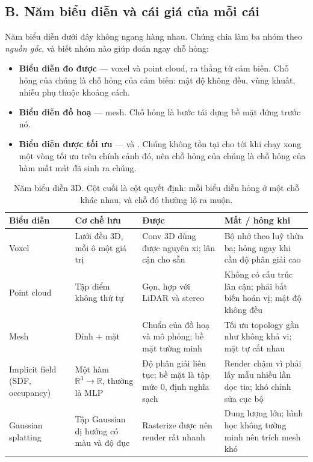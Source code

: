 \documentclass[../../../deep_learning.tex]{subfiles}
\begin{document}
\subsection{B. Năm biểu diễn và cái giá của mỗi cái}
Năm biểu diễn dưới đây không ngang hàng nhau. Chúng chia làm ba nhóm theo \emph{nguồn gốc}, và biết nhóm nào giúp đoán ngay chỗ hỏng:
\begin{itemize}
\item \textbf{Biểu diễn đo được} --- voxel và point cloud, ra thẳng từ cảm biến. Chỗ hỏng của chúng là chỗ hỏng của cảm biến: mật độ không đều, vùng khuất, nhiễu phụ thuộc khoảng cách.
\item \textbf{Biểu diễn đồ hoạ} --- mesh. Chỗ hỏng là bước tái dựng bề mặt đứng trước nó.
\item \textbf{Biểu diễn được tối ưu} ---  và . Chúng không tồn tại cho tới khi chạy xong một vòng tối ưu trên chính cảnh đó, nên chỗ hỏng của chúng là chỗ hỏng của hàm mất mát đã sinh ra chúng.
\end{itemize}

\begin{table}[H]\centering\small
\caption{Năm biểu diễn 3D. Cột cuối là cột quyết định: mỗi biểu diễn hỏng ở một chỗ khác nhau, và chỗ đó thường lộ ra muộn.}
\label{tab:bieu-dien-3d}
\begin{tabularx}{\linewidth}{@{}L{2.15cm}YYY@{}}
\toprule
\textbf{Biểu diễn} & \textbf{Cơ chế lưu} & \textbf{Được} & \textbf{Mất / hỏng khi}\\
\midrule
Voxel & Lưới đều 3D, mỗi ô một giá trị & Conv 3D dùng được nguyên xi; lân cận cho sẵn & Bộ nhớ theo luỹ thừa ba; hỏng ngay khi cần độ phân giải cao\\
Point cloud & Tập điểm không thứ tự & Gọn, hợp với LiDAR và stereo & Không có cấu trúc lân cận; phải bất biến hoán vị; mật độ không đều\\
Mesh & Đỉnh \(+\) mặt & Chuẩn của đồ hoạ và mô phỏng; bề mặt tường minh & Tối ưu topology gần như không khả vi; mặt tự cắt nhau\\
Implicit field (SDF, occupancy) & Một hàm \(\mathbb{R}^{3}\to\mathbb{R}\), thường là MLP & Độ phân giải liên tục; bề mặt là tập mức 0, định nghĩa sạch & Render chậm vì phải lấy mẫu nhiều lần dọc tia; khó chỉnh sửa cục bộ\\
Gaussian splatting & Tập Gaussian dị hướng có màu và độ đục & Rasterize được nên render rất nhanh & Dung lượng lớn; hình học không tường minh nên trích mesh khó\\
\bottomrule
\end{tabularx}
\end{table}
\end{document}
